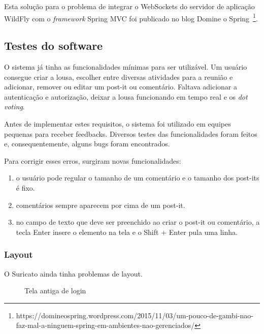 Esta solução para o problema de integrar o WebSockets do servidor de aplicação WildFly com o \textit{framework} Spring MVC foi publicado no blog Domine o Spring~\footnote{https://domineospring.wordpress.com/2015/11/03/um-pouco-de-gambi-nao-faz-mal-a-ninguem-spring-em-ambientes-nao-gerenciados/}. 

\subsection{Testes do software}
O sistema já tinha as funcionalidades mínimas para ser utilizável. Um usuário consegue criar a lousa, escolher entre diversas atividades para a reunião e adicionar, remover ou editar um post-it ou comentário. Faltava adicionar a autenticação e autorização, deixar a lousa funcionando em tempo real e os \textit{dot voting}.

Antes de implementar estes requisitos, o sistema foi utilizado em equipes pequenas para receber feedbacks. Diversos testes das funcionalidades foram feitos e, consequentemente, alguns bugs foram encontrados.

Para corrigir esses erros, surgiram novas funcionalidades:

\begin{enumerate}
	\item o usuário pode regular o tamanho de um comentário e o tamanho dos post-its é fixo.
	\item comentários sempre aparecem por cima de um post-it.
	\item no campo de texto que deve ser preenchido ao criar o post-it ou comentário, a tecla Enter insere o elemento na tela e o Shift + Enter pula uma linha.
\end{enumerate}

\subsubsection*{Layout}
O Suricato ainda tinha problemas de layout. 

\begin{figure}[H]
  \centering
  \caption{Tela antiga de login}\label{figura:loginAntigo}
\end{figure}

